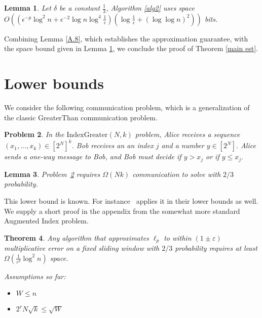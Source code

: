 \documentclass{article}
\newcommand{\eps}{\varepsilon}
\theoremstyle{plain}
\newtheorem{theorem}{Theorem}[section]
\newtheorem{lem}[theorem]{Lemma}
\newtheorem{problem}[theorem]{Problem}
\begin{document}
\begin{lem}\label{final space}
    Let $\delta$ be a constant $\frac 13$, Algorithm \ref{alg2} uses space  $O((\epsilon ^ {-p} \log ^ 2n + \epsilon ^ {-2}\log n \log ^ 4 \frac 1{\epsilon}) (\log \frac{1}{\epsilon} + (\log \log n) ^ 2))$ bits. 
\end{lem}

Combining Lemma \ref{A.8}, which establishes the approximation guarantee, with the space bound given in Lemma \ref{final space}, we conclude the proof of Theorem \ref{main est}.








%
 

\section{Lower bounds}
\label{sec:lower_bounds}

We consider the following communication problem, which is a generalization of the classic GreaterThan communication problem.

\begin{problem}
\label{prob:multi_greater_than}
In the $\text{IndexGreater}(N,k)$ problem, Alice receives a sequence $(x_1, \ldots, x_k) \in [2^N]^k$. Bob receives an an index $j$ and a number $y \in [2^N].$   Alice sends a one-way message to Bob, and Bob must decide if $y > x_j$ or if $y \leq x_j.$
\end{problem}

\begin{lem}
\label{lem:index_greater}
Problem~\ref{prob:multi_greater_than} requires $\Omega(Nk)$ communication to solve with $2/3$ probability.
\end{lem}

This lower bound is known. For instance~\cite{braverman2018nearly} applies it in their lower bounds as well.  We supply a short proof in the appendix from the somewhat more standard Augmented Index problem.




\iffalse

\begin{theorem}
Any algorithm that approximates $\ell_p$ to within $(1\pm \eps)$ multiplicative error on a fixed sliding window with $2/3$ probability requires at least $\Omega(\frac{1}{\eps^p}\log^2 n)$ space.

Assumptions so far:
\begin{itemize}
\item $W \leq n$
\item $2^r N \sqrt{k} \leq \sqrt{W}$
\end{itemize}

\end{theorem}
\end{document}
